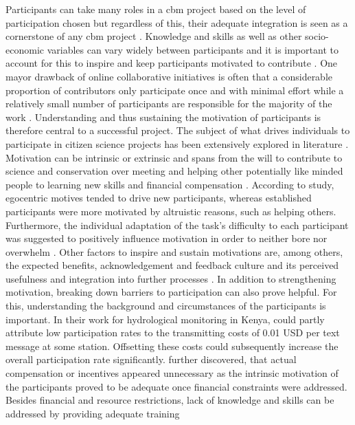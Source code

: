Participants can take many roles in a \acrshort*{cbm} project based on the level of participation chosen but regardless of this, their adequate integration is seen as a cornerstone of any \acrshort*{cbm} project \autocite{land-zandstraParticipantsCitizenScience2021}. Knowledge and skills as well as other socio-economic variables can vary widely between participants and it is important to account for this to inspire and keep participants motivated to contribute \autocite{minkmanCitizenScienceWater2015,whitelawEstablishingCanadianCommunity2003}. One mayor drawback of online collaborative initiatives is often that a considerable proportion of contributors only participate once and with minimal effort while a relatively small number of participants are responsible for the majority of the work \autocite{sauermannCrowdScienceUser2015}. Understanding and thus sustaining the motivation of participants is therefore central to a successful project. The subject of what drives individuals to participate in citizen science projects has been extensively explored in literature \autocite{land-zandstraParticipantsCitizenScience2021,minkmanCitizenScienceWater2015,mloza-bandaCrowdsensingSuccessfulWater2018,ruttenHowGetKeep2017,tipaldoCitizenScienceCommunitybased2017,walkerBenefitsNegativeImpacts2021a,walkerBenefitsNegativeImpacts2021}. Motivation can be intrinsic or extrinsic and spans from the will to contribute to science and conservation over meeting and helping other potentially like minded people to learning new skills and financial compensation \autocite{minkmanCitizenScienceWater2015,rotmanDynamicChangesMotivation2012 ruttenHowGetKeep2017}. According to \autocite{rotmanDynamicChangesMotivation2012}  study, egocentric motives tended to drive new participants, whereas established participants were more motivated by altruistic reasons, such as helping others. Furthermore, the individual adaptation of the task's difficulty to each participant was suggested to positively influence motivation in order to neither bore nor overwhelm \autocite{minkmanCitizenScienceWater2015}. Other factors to inspire and sustain motivations are, among others, the expected benefits, acknowledgement and feedback culture and its perceived usefulness and integration into further processes \autocite{land-zandstraParticipantsCitizenScience2021,minkmanCitizenScienceWater2015,pettiboneCitizenScienceAll2016}. In addition to strengthening motivation, breaking down barriers to participation can also prove helpful. For this, understanding the background and circumstances of the participants is important. In their work for hydrological monitoring in Kenya, \autocite{weeserCitizenSciencePioneers2018a} could partly attribute low participation rates to the transmitting costs of 0.01 USD per text message at some station. Offsetting these costs could subsequently increase the overall participation rate significantly. \autocite{weeserCitizenSciencePioneers2018a} further discovered, that actual compensation or incentives appeared unnecessary as the intrinsic motivation of the participants proved to be adequate once financial constraints were addressed. Besides financial and resource restrictions, lack of knowledge and skills can be addressed by providing adequate training 